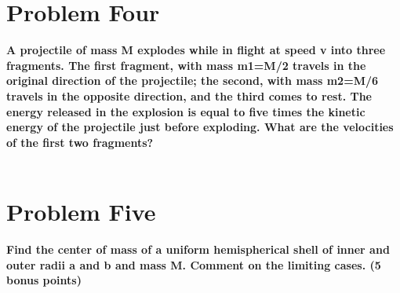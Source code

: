 \documentclass[10pt]{article} %
\begin{document}
\section{Problem Four}
\textbf{A projectile of mass M explodes while in flight at speed v into three fragments. The first fragment, with mass m1=M/2 travels in the original direction of the projectile; the second, with mass m2=M/6 travels in the opposite direction, and the third comes to rest. The energy released in the explosion is equal to five times the kinetic energy of the projectile just before exploding. What are the velocities of the first two fragments?} \\ \\
\vspace{1 cm}

\section{Problem Five}
\textbf{Find the center of mass of a uniform hemispherical shell of inner and outer radii a and b and mass M. Comment on the limiting cases. (5 bonus points)} \\ \\
\vspace{1 cm}
\end{document}
